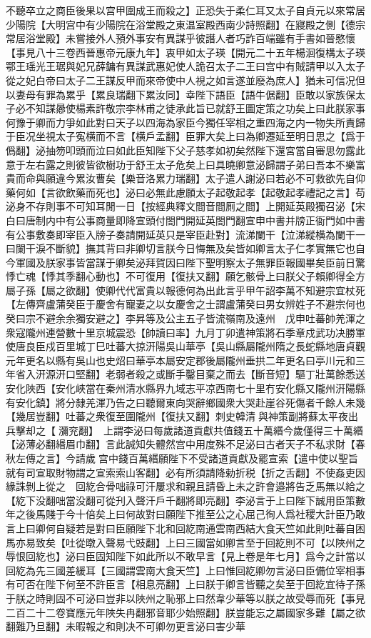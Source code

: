 不聽卒立之商臣後果以宫甲圍成王而殺之】正恐失于柔仁耳又太子自貞元以來常居少陽院【大明宫中有少陽院在浴堂殿之東温室殿西南少詩照翻】在寢殿之側【德宗常居浴堂殿】未嘗接外人預外事安有異謀乎彼譖人者巧詐百端雖有手書如晉愍懷【事見八十三卷西晉惠帝元康九年】衷甲如太子瑛【開元二十五年楊洄復構太子瑛鄂王瑶光王琚與妃兄薛鏞有異謀武惠妃使人詭召太子二王曰宫中有賊請甲以入太子從之妃白帝曰太子二王謀反甲而來帝使中人視之如言遂並廢為庶人】猶未可信况但以妻母有罪為累乎【累良瑞翻下累汝同】幸陛下語臣【語牛倨翻】臣敢以家族保太子必不知謀曏使楊素許敬宗李林甫之徒承此旨已就舒王圖定策之功矣上曰此朕家事何豫于卿而力爭如此對曰天子以四海為家臣今獨任宰相之重四海之内一物失所責歸于臣况坐視太子寃横而不言【横戶孟翻】臣罪大矣上曰為卿遷延至明日思之【爲于僞翻】泌抽笏叩頭而泣曰如此臣知陛下父子慈孝如初矣然陛下還宮當自審思勿露此意于左右露之則彼皆欲樹功于舒王太子危矣上曰具曉卿意泌歸謂子弟曰吾本不樂富貴而命與願違今累汝曹矣【樂音洛累力瑞翻】太子遣人謝泌曰若必不可救欲先自仰藥何如【言欲飲藥而死也】泌曰必無此慮願太子起敬起孝【起敬起孝禮記之言】苟泌身不存則事不可知耳閒一日【按經典釋文間音間厠之間】上開延英殿獨召泌【宋白曰唐制内中有公事商量即降宣頭付閤門開延英閤門翻宣申中書并牓正衙門如中書有公事敷奏即宰臣入牓子奏請開延英只是宰臣赴對】流涕闌干【泣涕縱横為闌干一曰闌干淚不斷貌】撫其背曰非卿切言朕今日悔無及矣皆如卿言太子仁孝實無它也自今軍國及朕家事皆當謀于卿矣泌拜賀因曰陛下聖明察太子無罪臣報國畢矣臣前日驚悸亡魂【悸其季翻心動也】不可復用【復扶又翻】願乞骸骨上曰朕父子賴卿得全方屬子孫【屬之欲翻】使卿代代富貴以報德何為出此言乎甲午詔李萬不知避宗宜杖死【左傳齊盧蒲癸臣于慶舍有寵妻之以女慶舍之士謂盧蒲癸曰男女辨姓子不避宗何也癸曰宗不避余余獨安避之】李昇等及公主五子皆流嶺南及遠州　戊申吐蕃帥羌渾之衆寇隴州連營數十里京城震恐【帥讀曰率】九月丁卯遣神策將石季章戍武功决勝軍使唐良臣戍百里城丁巳吐蕃大掠汧陽吳山華亭【吳山縣屬隴州隋之長蛇縣地唐貞觀元年更名以縣有吳山也史炤曰華亭本屬安定郡後屬隴州垂拱二年更名曰亭川元和三年省入汧源汧口堅翻】老弱者殺之或斷手鑿目棄之而去【斷音短】驅丁壯萬餘悉送安化陜西【安化峽當在秦州清水縣界九域志平凉西南七十里冇安化縣又隴州汧陽縣有安化鎮】將分隸羌渾乃告之曰聽爾東向哭辭鄉國衆大哭赴崖谷死傷者千餘人未幾【幾居豈翻】吐蕃之衆復至圍隴州【復扶又翻】刺史韓清與神策副將蘇太平夜出兵擊却之【瀰兖翻】　上謂李泌曰每歲諸道貢獻共值錢五十萬緡今歲僅得三十萬緡【泌薄必翻緡眉巾翻】言此誠知失體然宫中用度殊不足泌曰古者天子不私求財【春秋左傳之言】今請歲宫中錢百萬緡願陛下不受諸道貢獻及罷宣索【遣中使以聖旨就有司宣取財物謂之宣索索山客翻】必有所須請降勅折税【折之舌翻】不使姦吏因緣誅剝上從之　回紇合骨咄祿可汗屢求和親且請昏上未之許會邉將告乏馬無以給之【紇下没翻咄當没翻可從刋入聲汗戶千翻將即亮翻】李泌言于上曰陛下誠用臣策數年之後馬賤于今十倍矣上曰何故對曰願陛下推至公之心屈己徇人爲社稷大計臣乃敢言上曰卿何自疑若是對曰臣願陛下北和回紇南通雲南西結大食天竺如此則吐蕃自困馬亦易致矣【吐從暾入聲易弋豉翻】上曰三國當如卿言至于回紇則不可【以陜州之辱恨回紇也】泌曰臣固知陛下如此所以不敢早言【見上卷是年七月】爲今之計當以回紇為先三國差緩耳【三國謂雲南大食天竺】上曰惟回紇卿勿言泌曰臣備位宰相事有可否在陛下何至不許臣言【相息亮翻】上曰朕于卿言皆聽之矣至于回紇宜待子孫于朕之時則固不可泌曰豈非以陜州之恥邪上曰然韋少華等以朕之故受辱而死【事見二百二十二卷寶應元年陜失冉翻邪音耶少始照翻】朕豈能忘之屬國家多難【屬之欲翻難乃旦翻】未暇報之和則决不可卿勿更言泌曰害少華